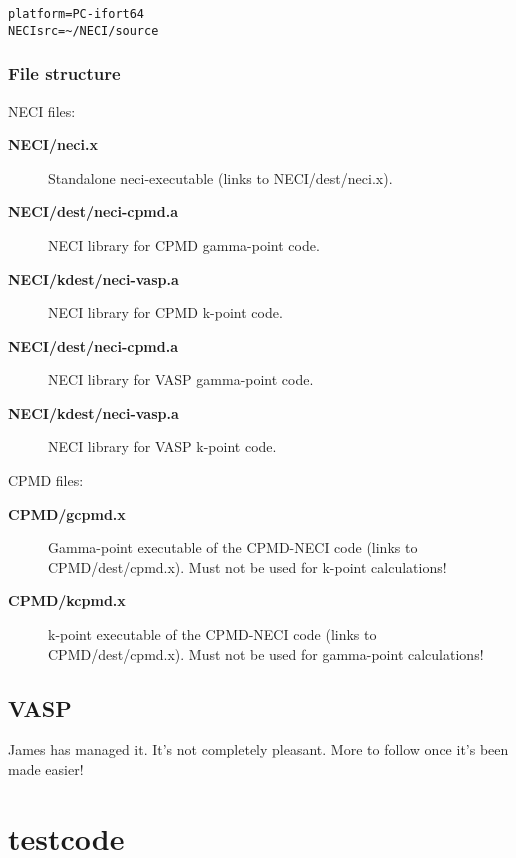 \documentclass[openany,a4paper,10pt]{manual}
\begin{document}
\begin{Verbatim}[commandchars=@\[\]]
platform=PC-ifort64
NECIsrc=~/NECI/source
\end{Verbatim}


\subsubsection{File structure}

NECI files:
\begin{description}
\item[\textbf{NECI/neci.x}]
Standalone neci-executable (links to NECI/dest/neci.x).

\item[\textbf{NECI/dest/neci-cpmd.a}]
NECI library for CPMD gamma-point code.

\item[\textbf{NECI/kdest/neci-vasp.a}]
NECI library for CPMD k-point code.

\item[\textbf{NECI/dest/neci-cpmd.a}]
NECI library for VASP gamma-point code.

\item[\textbf{NECI/kdest/neci-vasp.a}]
NECI library for VASP k-point code.

\end{description}

CPMD files:
\begin{description}
\item[\textbf{CPMD/gcpmd.x}]
Gamma-point executable of the CPMD-NECI code (links to CPMD/dest/cpmd.x).
Must not be used for k-point calculations!

\item[\textbf{CPMD/kcpmd.x}]
k-point executable of the CPMD-NECI code (links to CPMD/dest/cpmd.x).
Must not be used for gamma-point calculations!

\end{description}


\subsection{VASP}

James has managed it.  It's not completely pleasant.  More to follow
once it's been made easier!


\section{testcode}
\end{document}
